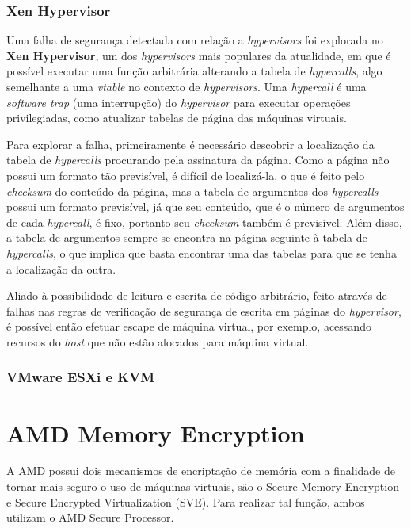 \documentclass{report}
\begin{document}
\subsection{Xen Hypervisor}

Uma falha de segurança detectada com relação a \textit{hypervisors} foi
explorada no \textbf{Xen Hypervisor}, um dos \textit{hypervisors} mais
populares da atualidade, em que é possível executar uma função arbitrária
alterando a tabela de \textit{hypercalls}, algo semelhante a uma
\textit{vtable} no contexto de \textit{hypervisors}. Uma \textit{hypercall} é
uma \textit{software trap} (uma interrupção) do \textit{hypervisor} para
executar operações privilegiadas, como atualizar tabelas de página das máquinas
virtuais.

Para explorar a falha, primeiramente é necessário descobrir a localização da
tabela de \textit{hypercalls} procurando pela assinatura da página. Como a
página não possui um formato tão previsível, é difícil de localizá-la, o que é
feito pelo \textit{checksum} do conteúdo da página, mas a tabela de argumentos
dos \textit{hypercalls} possui um formato previsível, já que seu conteúdo, que
é o número de argumentos de cada \textit{hypercall}, é fixo, portanto seu
\textit{checksum} também é previsível. Além disso, a tabela de argumentos
sempre se encontra na página seguinte à tabela de \textit{hypercalls}, o que
implica que basta encontrar uma das tabelas para que se tenha a localização da
outra.

Aliado à possibilidade de leitura e escrita de código arbitrário, feito através
de falhas nas regras de verificação de segurança de escrita em páginas do
\textit{hypervisor}, é possível então efetuar escape de máquina virtual, por
exemplo, acessando recursos do \textit{host} que não estão alocados para
máquina virtual.

\subsection{VMware ESXi e KVM}

\chapter{AMD Memory Encryption}

A AMD possui dois mecanismos de encriptação de memória com a finalidade de
tornar mais seguro o uso de máquinas virtuais, são o Secure Memory Encryption e
Secure Encrypted Virtualization (SVE). Para realizar tal função, ambos utilizam
o AMD Secure Processor.
\end{document}

